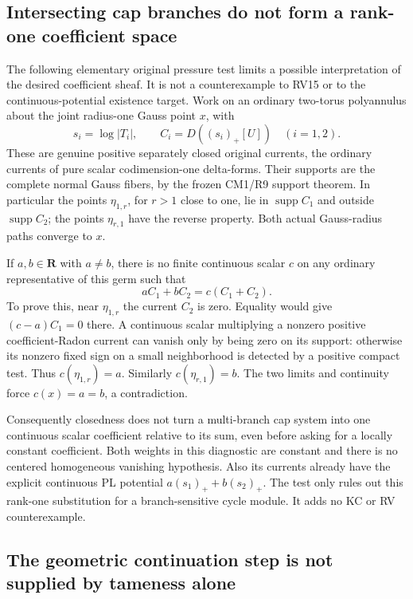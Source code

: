 \subsection{Intersecting cap branches do not form a rank-one coefficient space}

The following elementary original pressure test limits a possible
interpretation of the desired coefficient sheaf.  It is not a
counterexample to RV15 or to the continuous-potential existence
target.  Work on an ordinary two-torus polyannulus about the joint
radius-one Gauss point \(x\), with
\[
 s_i=\log|T_i|,\qquad
 C_i=D((s_i)_+[U])\quad(i=1,2).                            \tag{AP24.13}
\]
These are genuine positive separately closed original currents,
the ordinary currents of pure scalar codimension-one delta-forms.
Their supports are the complete normal Gauss fibers, by the
frozen CM1/R9 support theorem.  In particular the points
\(\eta_{1,r}\), for \(r>1\) close to one, lie in
\(\operatorname{supp}C_1\) and outside
\(\operatorname{supp}C_2\); the points \(\eta_{r,1}\) have
the reverse property.  Both actual Gauss-radius paths converge
to \(x\).

If \(a,b\in\mathbf R\) with \(a\ne b\), there is no finite
continuous scalar \(c\) on any ordinary representative of this
germ such that
\[
                      aC_1+bC_2=c(C_1+C_2).                \tag{AP24.14}
\]
To prove this, near \(\eta_{1,r}\) the current \(C_2\) is
zero.  Equality would give \((c-a)C_1=0\) there.  A continuous
scalar multiplying a nonzero positive coefficient-Radon current
can vanish only by being zero on its support: otherwise its
nonzero fixed sign on a small neighborhood is detected by a
positive compact test.  Thus \(c(\eta_{1,r})=a\).
Similarly \(c(\eta_{r,1})=b\).  The two limits and continuity
force \(c(x)=a=b\), a contradiction.

Consequently closedness does not turn a multi-branch cap system
into one continuous scalar coefficient relative to its sum, even
before asking for a locally constant coefficient.  Both weights
in this diagnostic are constant and there is no centered
homogeneous vanishing hypothesis.  Also its currents already have
the explicit continuous PL potential
\(a(s_1)_++b(s_2)_+\).  The test only rules out this rank-one
substitution for a branch-sensitive cycle module.  It adds no
KC or RV counterexample.

\subsection{The geometric continuation step is not supplied by tameness alone}

